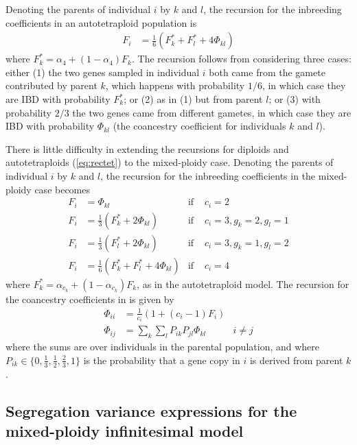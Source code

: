 \documentclass[11pt,a4paper]{article}
\begin{document}
Denoting the parents of individual $i$ by $k$ and $l$, the recursion for the
inbreeding coefficients in an autotetraploid population is
\begin{align}
    F_i &= \frac1 6 (F_k^\ast + F_l^\ast + 4\Phi_{kl}) \label{eq:rectet}
\end{align}
where $F_k^\ast = \alpha_4 + (1-\alpha_4)F_k$.
The recursion follows from considering three cases:
either (1) the two genes sampled in individual $i$ both came from the gamete
contributed by parent $k$, which happens with probability $1/6$, in which case
they are IBD with probability $F_k^\ast$; or (2) as in (1) but from parent $l$; or
(3) with probability $2/3$ the two genes came from different gametes, in which
case they are IBD with probability $\Phi_{kl}$ (the coancestry coefficient for
individuals $k$ and $l$).

There is little difficulty in extending the recursions for diploids
\citep{barton2017} and autotetraploids (\cref{eq:rectet}) to the mixed-ploidy
case. 
Denoting the parents of individual $i$ by $k$ and $l$, the recursion for the
inbreeding coefficients in the mixed-ploidy case becomes
\begin{align}
    F_i &= \Phi_{kl} & \text{if } & c_i = 2 \nonumber \\ 
    F_i &= \frac{1}{3}\left(F_k^\ast + 2\Phi_{kl}\right) & \text{if } 
        & c_i = 3, g_k = 2, g_l = 1 \nonumber \\ 
    F_i &= \frac{1}{3}\left(F_l^\ast + 2\Phi_{kl}\right) & \text{if } 
        & c_i = 3, g_k = 1, g_l = 2 \nonumber \\ 
    F_i &= \frac1 6 (F_k^\ast + F_l^\ast + 4\Phi_{kl}) & \text{if } & c_i = 4
\end{align}
where $F_k^\ast = \alpha_{c_k} + (1-\alpha_{c_k})F_k$, as in the
autotetraploid model.
The recursion for the coancestry coefficients in is given by
\begin{align}
    \Phi_{ii} &= \frac{1}{c_{i}} \left(1 + (c_i-1)F_i\right) \nonumber \\
    \Phi_{ij} &= \sum_k \sum_l P_{ik}P_{jl} \Phi_{kl} & i \ne j 
    \label{eq:coancestry}
\end{align}
where the sums are over individuals in the parental population, and where
$P_{ik} \in \{0, \frac1 3, \frac1 2, \frac2 3, 1\}$ is the probability that a
gene copy in $i$ is derived from parent $k$.


\subsection{Segregation variance expressions for the mixed-ploidy infinitesimal model \label{sec:segvar}}
\end{document}
